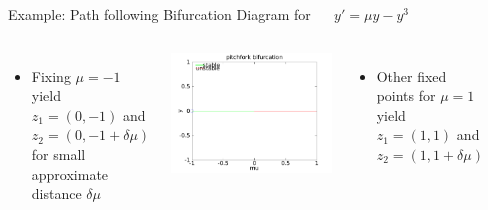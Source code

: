 \documentclass{beamer}
\begin{document}
\begin{frame}{Example: Path following}
    Bifurcation Diagram for ~~ $y' = \mu y - y^3 $
    \begin{columns}
        \begin{itemize}
            \item Fixing $\mu = -1$ yield $z_{1} = (0, -1)$ and $z_{2} = (0, -1 + \delta \mu)${}
            for small approximate distance $\delta\mu$
            \\
        \end{itemize}
        \pause
        \includegraphics[width=1\textwidth]{grafik/pfexample1}
        \pause
        \begin{itemize}
            \item Other fixed points for $\mu = 1$ yield $z_{1} = (1, 1)$ and $z_{2} = (1, 1 + \delta \mu)$
            \\
        \end{itemize}
        ~\\
        ~\\
        

\end{columns}
\end{frame}
\end{document}
